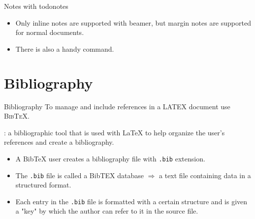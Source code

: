 \documentclass{beamer}
\let\todox\todo
\renewcommand\todo[1]{\todox[inline]{#1}}
\begin{document}
\begin{darkframes}

\begin{frame}[fragile]{Notes with todonotes}
\begin{itemize}
	\item Only inline notes are supported with
	beamer, but margin notes are supported for normal
	documents.
	\item There is also a handy \texttt{\listoftodos} command.
\end{itemize}
	
\end{frame}

\section{Bibliography}

\begin{frame}[<+->]{Bibliography}
To manage and include references in a LATEX document use \textsc{BibTeX}.\\
\begin{description}
	\item[BibTex]: a bibliographic tool that is used with LaTeX to help organize the user's references and create a bibliography.
	\begin{itemize}
		\item A BibTeX user creates a bibliography file with \texttt{.bib} extension.
		\item The \texttt{.bib} file is called a BibTEX database $\Rightarrow$ a text file containing data in a structured format.
		\item Each entry in the \texttt{.bib} file is formatted with a certain structure and is given a "key" by which the author can refer to it in the source file.
	\end{itemize}
\end{description}
\end{frame}


\end{darkframes}
\end{document}
